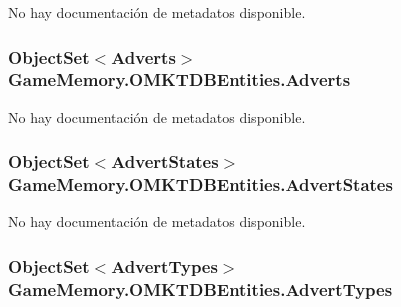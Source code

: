 No hay documentación de metadatos disponible. 

\hypertarget{class_game_memory_1_1_o_m_k_t_d_b_entities_ac5da413d49a76b19ec5cd64055135752}{
\subsubsection[{Adverts}]{\setlength{\rightskip}{0pt plus 5cm}Object\-Set$<${\bf Adverts}$>$ Game\-Memory.\-O\-M\-K\-T\-D\-B\-Entities.\-Adverts\hspace{0.3cm}{\ttfamily [get]}}}\label{class_game_memory_1_1_o_m_k_t_d_b_entities_ac5da413d49a76b19ec5cd64055135752}


No hay documentación de metadatos disponible. 

\hypertarget{class_game_memory_1_1_o_m_k_t_d_b_entities_ae8585a7bdd0f94ad4fe4247d53ed541b}{
\subsubsection[{Advert\-States}]{\setlength{\rightskip}{0pt plus 5cm}Object\-Set$<${\bf Advert\-States}$>$ Game\-Memory.\-O\-M\-K\-T\-D\-B\-Entities.\-Advert\-States\hspace{0.3cm}{\ttfamily [get]}}}\label{class_game_memory_1_1_o_m_k_t_d_b_entities_ae8585a7bdd0f94ad4fe4247d53ed541b}


No hay documentación de metadatos disponible. 

\hypertarget{class_game_memory_1_1_o_m_k_t_d_b_entities_a39200deaba3b74b8048484063082f12c}{
\subsubsection[{Advert\-Types}]{\setlength{\rightskip}{0pt plus 5cm}Object\-Set$<${\bf Advert\-Types}$>$ Game\-Memory.\-O\-M\-K\-T\-D\-B\-Entities.\-Advert\-Types\hspace{0.3cm}{\ttfamily [get]}}}\label{class_game_memory_1_1_o_m_k_t_d_b_entities_a39200deaba3b74b8048484063082f12c}


